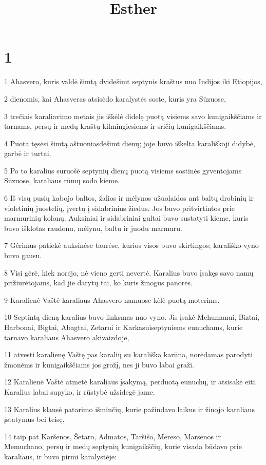 

\title{Esther}

\chapter{1}


\par 1 Ahasvero, kuris valdė šimtą dvidešimt septynis kraštus nuo Indijos iki Etiopijos, 
\par 2 dienomis, kai Ahasveras atsisėdo karalystės soste, kuris yra Sūzuose, 
\par 3 trečiais karaliavimo metais jis iškėlė didelę puotą visiems savo kunigaikščiams ir tarnams, persų ir medų kraštų kilmingiesiems ir sričių kunigaikščiams. 
\par 4 Puota tęsėsi šimtą aštuoniasdešimt dienų; joje buvo iškelta karališkoji didybė, garbė ir turtai. 
\par 5 Po to karalius suruošė septynių dienų puotą visiems sostinės gyventojams Sūzuose, karaliaus rūmų sodo kieme. 
\par 6 Iš visų pusių kabojo baltos, žalios ir mėlynos užuolaidos ant baltų drobinių ir violetinių juostelių, įvertų į sidabrinius žiedus. Jos buvo pritvirtintos prie marmurinių kolonų. Auksiniai ir sidabriniai gultai buvo sustatyti kieme, kuris buvo išklotas raudonu, mėlynu, baltu ir juodu marmuru. 
\par 7 Gėrimus patiekė auksinėse taurėse, kurios visos buvo skirtingos; karališko vyno buvo gausu. 
\par 8 Visi gėrė, kiek norėjo, nė vieno gerti nevertė. Karalius buvo įsakęs savo namų prižiūrėtojams, kad jie darytų tai, ko kuris žmogus panorės. 
\par 9 Karalienė Vaštė karaliaus Ahasvero namuose kėlė puotą moterims. 
\par 10 Septintą dieną karalius buvo linksmas nuo vyno. Jis įsakė Mehumanui, Biztai, Harbonai, Bigtai, Abagtai, Zetarui ir Karkasui­septyniems eunuchams, kurie tarnavo karaliaus Ahasvero akivaizdoje, 
\par 11 atvesti karalienę Vaštę pas karalių su karališka karūna, norėdamas parodyti žmonėms ir kunigaikščiams jos grožį, nes ji buvo labai graži. 
\par 12 Karalienė Vaštė atmetė karaliaus įsakymą, perduotą eunuchų, ir atsisakė eiti. Karalius labai supyko, ir rūstybė užsidegė jame. 
\par 13 Karalius klausė patarimo išminčių, kurie pažindavo laikus ir žinojo karaliaus įstatymus bei teisę, 
\par 14 taip pat Karšenos, Šetaro, Admatos, Taršišo, Mereso, Marsenos ir Memuchano, persų ir medų septynių kunigaikščių, kurie visada būdavo prie karaliaus, ir buvo pirmi karalystėje: 
